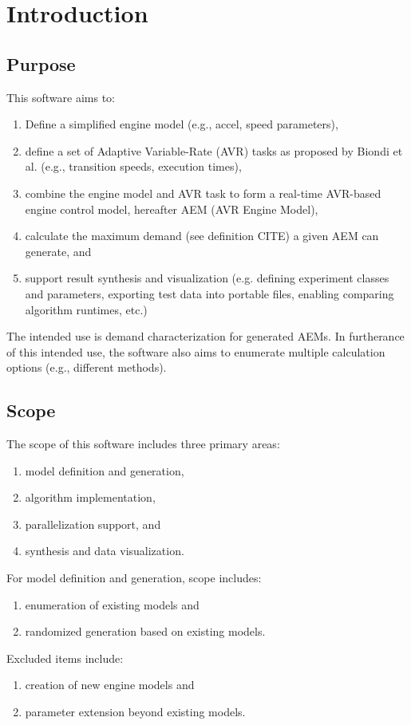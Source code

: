 \section{Introduction}
\subsection{Purpose}

This software aims to:
\begin{enumerate}
    \item Define a simplified engine model (e.g., accel, speed parameters),
    \item define a set of Adaptive Variable-Rate (AVR) tasks as proposed by
    Biondi et al. \cite{biondi} (e.g., transition speeds, execution times),
    \item combine the engine model and AVR task to form a real-time AVR-based
    engine control model, hereafter AEM (AVR Engine Model),
    \item calculate the maximum demand (see definition CITE)
    a given AEM can generate, and
    \item support result synthesis and visualization (e.g. defining experiment
    classes and parameters, exporting test data into portable files, enabling 
    comparing algorithm runtimes, etc.)
\end{enumerate}

The intended use is demand characterization for generated AEMs.
In furtherance of this intended use, the software also aims to
enumerate multiple calculation options (e.g., different methods).

\subsection{Scope}

The scope of this software includes three primary areas:
\begin{enumerate}
    \item model definition and generation,
    \item algorithm implementation,
    \item parallelization support, and
    \item synthesis and data visualization.
\end{enumerate}

For model definition and generation, scope includes:
\begin{enumerate}
    \item enumeration of existing models and
    \item randomized generation based on existing models.
\end{enumerate}
Excluded items include:
\begin{enumerate}
    \item creation of new engine models and
    \item parameter extension beyond existing models.
\end{enumerate}

